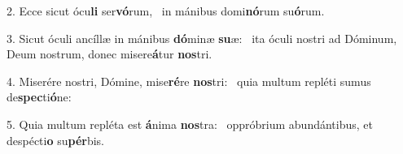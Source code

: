 2. Ecce sicut ócu\textbf{li} ser\textbf{vó}rum, \ast\  in mánibus domi\textbf{nó}rum su\textbf{ó}rum.\

3. Sicut óculi ancíllæ in mánibus \textbf{dó}minæ \textbf{su}æ: \ast\  ita óculi nostri ad Dóminum, Deum nostrum, donec misere\textbf{á}tur \textbf{nos}tri.\

4. Miserére nostri, Dómine, mise\textbf{ré}re \textbf{nos}tri: \ast\  quia multum repléti sumus de\textbf{spec}ti\textbf{ó}ne:\

5. Quia multum repléta est \textbf{á}nima \textbf{nos}tra: \ast\  oppróbrium abundántibus, et despécti\textbf{o} su\textbf{pér}bis.\

